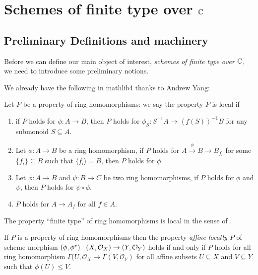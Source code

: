 \chapter{Schemes of finite type over $\mathbb{C}$}

\section{Preliminary Definitions and machinery}

Before we can define our main object of interest, {\em schemes of finite type over $\mathbb{C}$}, we need to introduce some preliminary notions.

We already have the following in {\sf mathlib4} thanks to Andrew Yang:
\begin{definition}\label{def:ring-hom-prop-local}
  Let $P$ be a property of ring homomorphisms:
    we say the property $P$ is local if
    \begin{enumerate}
      \item if $P$ holds for $\phi : A \to B$, then $P$ holds for $\phi_S: S^{-1}A \to \left\langle f(S)\right\rangle^{-1} B$ for any submonoid $S \subseteq A$.
      \item Let $\phi : A \to B$ be a ring homomorphism, if $P$ holds for $A \stackrel{\phi}{\to} B \to B_{f_i}$ for some $\{f_i\} \subseteq B$ such that $\langle f_i\rangle = B$, then $P$ holds for $\phi$.
      \item Let $\phi : A \to B$ and $\psi : B \to C$ be two ring homomorphisms, if $P$ holds for $\phi$ and $\psi$, then $P$ holds for $\psi \circ \phi$.
      \item $P$ holds for $A \to A_f$ for all $f \in A$.
    \end{enumerate}
\end{definition}

\begin{proposition}
  The property ``finite type'' of ring homomorphisms is local in the sense of .
\end{proposition}

\begin{definition}
  If $P$ is a property of ring homomorphisms then the property {\em affine locally $P$} of scheme morphism $(\phi, \phi^*): \left(X, \mathcal{O}_{X}\right) \to \left(Y, \mathcal{O}_{Y}\right)$ holds if and only if $P$ holds for all ring homomorphism $\Gamma(U, \mathcal{O}_X \to \Gamma(V, \mathcal{O}_Y)$ for all affine subsets $U \subseteq X$ and $V \subseteq Y$ such that $\phi(U) \le V$.

\end{definition}

